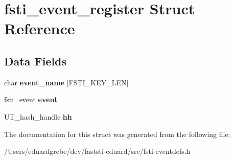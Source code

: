 \hypertarget{structfsti__event__register}{}\section{fsti\+\_\+event\+\_\+register Struct Reference}
\label{structfsti__event__register}
\subsection*{Data Fields}
\begin{DoxyCompactItemize}
\item 
\mbox{\label{structfsti__event__register_ac8fc7fe0daffe4f15f269295a45391df}} 
char {\bfseries event\+\_\+name} \mbox{[}F\+S\+T\+I\+\_\+\+K\+E\+Y\+\_\+\+L\+EN\mbox{]}
\item 
\mbox{\label{structfsti__event__register_af0894dde71c78fbcbb04733de4bd4857}} 
fsti\+\_\+event {\bfseries event}
\item 
\mbox{\label{structfsti__event__register_a0e7eff8a88f39452ca3e25ef6616ebbf}} 
U\+T\+\_\+hash\+\_\+handle {\bfseries hh}
\end{DoxyCompactItemize}


The documentation for this struct was generated from the following file\+:\begin{DoxyCompactItemize}
\item 
/\+Users/eduardgrebe/dev/faststi-\/eduard/src/fsti-\/eventdefs.\+h\end{DoxyCompactItemize}
